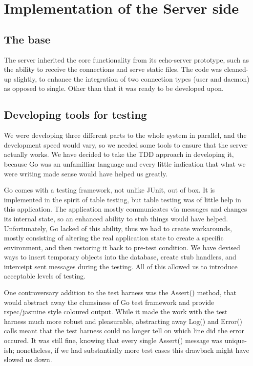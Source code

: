 \documentclass{l3proj}
\begin{document}
\section{Implementation of the Server side}

\subsection{The base}

The server inherited the core functionality from its echo-server prototype, such as the ability to receive the connections and serve static files. The code was cleaned-up slightly, to enhance the integration of two connection types (user and daemon) as opposed to single. Other than that it was ready to be developed upon.

\subsection{Developing tools for testing}

We were developing three different parts to the whole system in parallel, and the development speed would vary, so we needed some tools to ensure that the server actually works. We have decided to take the TDD approach in developing it, because Go was an unfamilliar language and every little indication that what we were writing made sense would have helped us greatly.

Go comes with a testing framework, not unlike JUnit, out of box. It is implemented in the spirit of table testing, but table testing was of little help in this application. The application mostly communicates via messages and changes its internal state, so an enhanced ability to stub things would have helped. Unfortunately, Go lacked of this ability, thus we had to create workarounds, mostly consisting of altering the real application state to create a specific environment, and then restoring it back to pre-test condition. We have devised ways to insert temporary objects into the database, create stub handlers, and interceipt sent messages during the testing. All of this allowed us to introduce acceptable levels of testing.

One controversary addition to the test harness was the Assert() method, that would abstract away the clumsiness of Go test framework and provide rspec/jasmine style coloured output. While it made the work with the test harness much more robust and pleasurable, abstracting away Log() and Error() calls meant that the test harness could no longer tell on which line did the error occured. It was still fine, knowing that every single Assert() message was unique-ish; nonetheless, if we had substantially more test cases this drawback might have slowed us down.
\end{document}
